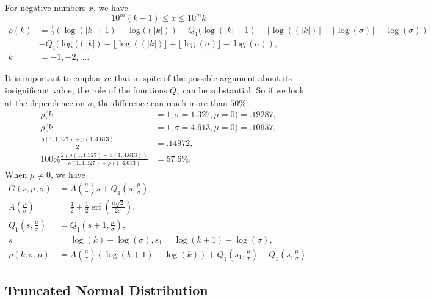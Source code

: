 \documentclass[titlepage,fleqn]{article}%
\begin{document}
For negative numbers $x$, we have%
\[
10^{m}(k-1)\leq x\leq10^{m}k
\]%
\begin{align}
\rho(k)  &  =\frac{1}{2}\left(  \log(\left\vert k\right\vert +1)-\log
((\left\vert k\right\vert )\right)  +Q_{1}(\log(\left\vert k\right\vert
+1)-\lfloor\log((\left\vert k\right\vert )\rfloor+\lfloor\log(\sigma
)\rfloor-\log(\sigma))\\
&  -Q_{1}(\log((\left\vert k\right\vert )-\lfloor\log((\left\vert k\right\vert
)\rfloor+\lfloor\log(\sigma)\rfloor-\log(\sigma)),\nonumber\\
k  &  =-1,-2,\ldots.\nonumber
\end{align}


It is important to emphasize that in spite of the possible argument about its
insignificant value, the role of the functions $Q_{1}$ can be substantial. So
if we look at the dependence on $\sigma$, the difference can reach more than
$50\%$.%
\begin{align*}
\rho(k  &  =1,\sigma=1.327,\mu=0)=.19287,\\
\rho(k  &  =1,\sigma=4.613,\mu=0)=.10657,\\
\frac{\rho(1,1.327)+\rho(1,4.613)}{2}  &  =.14972,\\
100\%\frac{2(\rho(1,1.327)-\rho(1,4.613))}{\rho(1,1.327)+\rho(1,4.613)}  &
=57.6\%.
\end{align*}
When $\mu\neq0$, we have%
\begin{align*}
G(s,\mu,\sigma)  &  =A\left(  \frac{\mu}{\sigma}\right)  s+Q_{1}\left(
s,\frac{\mu}{\sigma}\right)  ,\\
A\left(  \frac{\mu}{\sigma}\right)   &  =\frac{1}{2}+\frac{1}{2}%
\operatorname{erf}\left(  \frac{\mu\sqrt{2}}{2\sigma}\right)  ,\\
Q_{1}\left(  s,\frac{\mu}{\sigma}\right)   &  =Q_{1}\left(  s+1,\frac{\mu
}{\sigma}\right)  ,\\
s  &  =\log(k)-\log(\sigma),s_{1}=\log(k+1)-\log(\sigma),\\
\rho(k,\sigma,\mu)  &  =A\left(  \frac{\mu}{\sigma}\right)  \left(
\log(k+1)-\log(k)\right)  +Q_{1}\left(  s_{1},\frac{\mu}{\sigma}\right)
-Q_{1}\left(  s,\frac{\mu}{\sigma}\right)  .
\end{align*}


\subsection{Truncated Normal Distribution}
\end{document}

